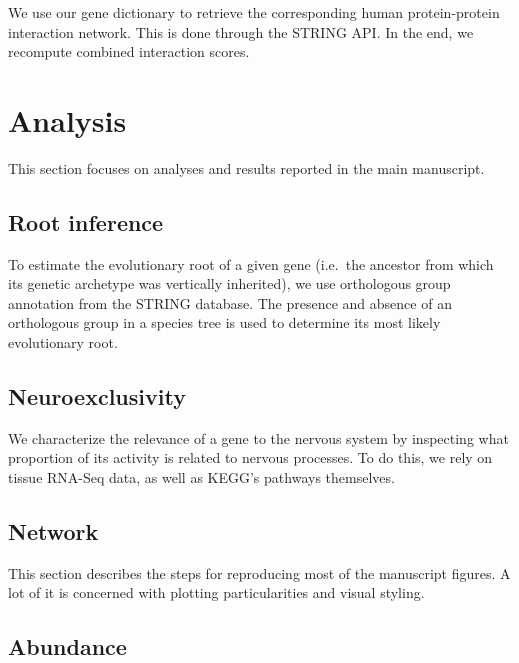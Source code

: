 \documentclass[
]{article}
\begin{document}
We use our gene dictionary to retrieve the corresponding human
protein-protein interaction network. This is done through the STRING
API. In the end, we recompute combined interaction scores.


\clearpage

\hypertarget{analysis}{%
\section{Analysis}\label{analysis}}

This section focuses on analyses and results reported in the main
manuscript.

\hypertarget{root-inference}{%
\subsection{Root inference}\label{root-inference}}

To estimate the evolutionary root of a given gene (i.e.~the ancestor
from which its genetic archetype was vertically inherited), we use
orthologous group annotation from the STRING database. The presence and
absence of an orthologous group in a species tree is used to determine
its most likely evolutionary root. 

\hypertarget{neuroexclusivity-1}{%
\subsection{Neuroexclusivity}\label{neuroexclusivity-1}}

We characterize the relevance of a gene to the nervous system by
inspecting what proportion of its activity is related to nervous
processes. To do this, we rely on tissue RNA-Seq data, as well as KEGG's
pathways themselves. 

\hypertarget{network-1}{%
\subsection{Network}\label{network-1}}

This section describes the steps for reproducing most of the manuscript
figures. A lot of it is concerned with plotting particularities and
visual styling. 

\hypertarget{abundance}{%
\subsection{Abundance}\label{abundance}}
\end{document}
